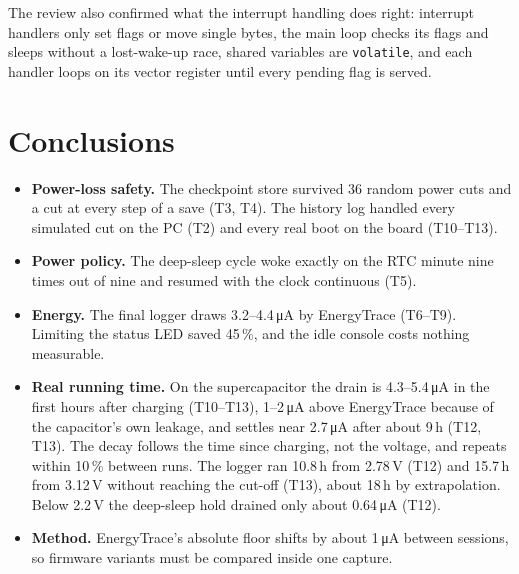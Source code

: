 \documentclass[11pt,a4paper]{article}
\newcommand{\uA}{\,\si{\micro\ampere}}
\newcommand{\code}[1]{\texttt{#1}}
\begin{document}
The review also confirmed what the interrupt handling does right: interrupt handlers only set flags or move single bytes, the main loop checks its flags and sleeps without a lost-wake-up race, shared variables are \code{volatile}, and each handler loops on its vector register until every pending flag is served.

\section{Conclusions}

\begin{itemize}
  \item \textbf{Power-loss safety.} The checkpoint store survived 36 random power cuts and a cut at every step of a save (T3, T4). The history log handled every simulated cut on the PC (T2) and every real boot on the board (T10--T13).
  \item \textbf{Power policy.} The deep-sleep cycle woke exactly on the RTC minute nine times out of nine and resumed with the clock continuous (T5).
  \item \textbf{Energy.} The final logger draws 3.2--4.4\uA{} by EnergyTrace (T6--T9). Limiting the status LED saved 45\,\%, and the idle console costs nothing measurable.
  \item \textbf{Real running time.} On the supercapacitor the drain is 4.3--5.4\uA{} in the first hours after charging (T10--T13), 1--2\uA{} above EnergyTrace because of the capacitor's own leakage, and settles near 2.7\uA{} after about 9\,h (T12, T13). The decay follows the time since charging, not the voltage, and repeats within 10\,\% between runs. The logger ran 10.8\,h from 2.78\,V (T12) and 15.7\,h from 3.12\,V without reaching the cut-off (T13), about 18\,h by extrapolation. Below 2.2\,V the deep-sleep hold drained only about 0.64\uA{} (T12).
  \item \textbf{Method.} EnergyTrace's absolute floor shifts by about 1\uA{} between sessions, so firmware variants must be compared inside one capture.
\end{itemize}
\end{document}
